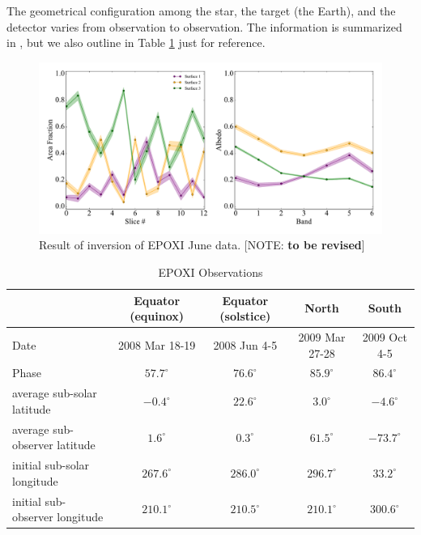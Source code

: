 \documentclass[iop,numberedappendix,apj,]{emulateapj}
\def\memoYF#1{\color{red}[NOTE: {\bf #1}]\color{black}}
\begin{document}
The geometrical configuration among the star, the target (the Earth), and the detector varies from observation to observation. 
The information is summarized in \citet{Cowan2011}, but we also outline in Table \ref{tab:EPOXI} just for reference. 

\begin{figure}[!bt]
    \begin{center}
    \includegraphics[width=\hsize]{June_xmed_std_GPReg.pdf}
    \end{center}
    \caption{Result of inversion of EPOXI June data. \memoYF{to be revised}}
\label{fig:mcmc_June_tmp}
\end{figure}

\begin{table}[htp]
\caption{EPOXI Observations}
\begin{center}
\begin{tabular}{lcccc} \hline \hline
& Equator (equinox) & Equator (solstice) & North & South \\ \hline
Date & 2008 Mar 18-19 & 2008 Jun 4-5 & 2009 Mar 27-28 & 2009 Oct 4-5 \\ 
Phase & $57.7^{\circ }$ & $76.6^{\circ }$ & $85.9^{\circ }$ & $86.4^{\circ }$ \\ 
average sub-solar latitude & $-0.4^{\circ }$ & $22.6^{\circ }$ & $3.0^{\circ }$ & $-4.6^{\circ }$ \\
average sub-observer latitude & $1.6^{\circ }$ & $0.3^{\circ }$ & $61.5^{\circ }$ & $-73.7^{\circ }$  \\
initial sub-solar longitude & $267.6^{\circ }$ & $286.0^{\circ }$ & $296.7^{\circ }$ & $33.2^{\circ }$ \\
initial sub-observer longitude & $210.1^{\circ }$ & $210.5^{\circ }$ & $210.1^{\circ }$ & $300.6^{\circ }$ \\ \hline
\end{tabular}
\end{center}
\label{tab:EPOXI}
\end{table}%
\end{document}
